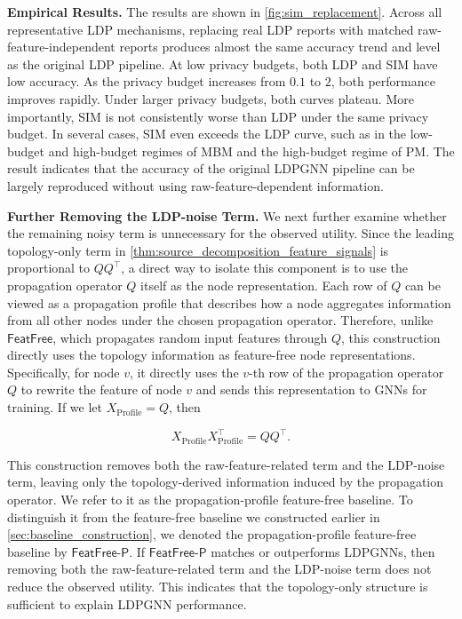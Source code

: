 \documentclass[conference,compsoc]{IEEEtran}
\theoremstyle{boldplain}
\theoremstyle{bolddefinition}
\theoremstyle{remark}
\newcommand{\mypara}[1]{\noindent\textbf{#1.}\xspace}
\newcommand{\ff}{\ensuremath{\mathsf{FeatFree}}\xspace}
\newcommand{\ldpgnn}{LDPGNN\xspace}
\newcommand{\ldpgnns}{LDPGNNs\xspace}
\newcommand{\mbmm}{MBM\xspace}
\newcommand{\pmm}{PM\xspace}
\newcommand{\ffprofile}{\ensuremath{\mathsf{FeatFree\text{-}P}}\xspace}
\begin{document}
\vspace{0.1cm}

\mypara{Empirical Results}
The results are shown in \autoref{fig:sim_replacement}. 
Across all representative LDP mechanisms, replacing real LDP reports with matched raw-feature-independent reports produces almost the same accuracy trend and level as the original LDP pipeline. 
At low privacy budgets, both LDP and SIM have low accuracy. 
As the privacy budget increases from $0.1$ to $2$, both performance improves rapidly. 
Under larger privacy budgets, both curves plateau. 
More importantly, SIM is not consistently worse than LDP under the same privacy budget.
In several cases, SIM even exceeds the LDP curve, such as in the low-budget and high-budget regimes of \mbmm and the high-budget regime of \pmm. 
The result indicates that the accuracy of the original \ldpgnn pipeline can be largely reproduced without using raw-feature-dependent information.

\vspace{0.1cm}

\mypara{Further Removing the LDP-noise Term}
We next further examine whether the remaining noisy term is unnecessary for the observed utility.
Since the leading topology-only term in \autoref{thm:source_decomposition_feature_signals} is proportional to $QQ^\top$, a direct way to isolate this component is to use the propagation operator $Q$ itself as the node representation. 
Each row of $Q$ can be viewed as a propagation profile that describes how a node aggregates information from all other nodes under the chosen propagation operator.
Therefore, unlike \ff, which propagates random input features through $Q$, this construction directly uses the topology information as feature-free node representations.
Specifically, for node $v$, it directly uses the $v$-th row of the propagation operator $Q$ to rewrite the feature of node $v$ and sends this representation to GNNs for training.
If we let $X_{\mathrm{Profile}} = Q$, then

\begin{equation}
    X_{\mathrm{Profile}}X_{\mathrm{Profile}}^\top = QQ^\top . 
\end{equation}

This construction removes both the raw-feature-related term and the LDP-noise term, leaving only the topology-derived information induced by the propagation operator. 
We refer to it as the propagation-profile feature-free baseline.
To distinguish it from the feature-free baseline we constructed earlier in \autoref{sec:baseline_construction}, we denoted the propagation-profile feature-free baseline by \ffprofile.
If \ffprofile matches or outperforms \ldpgnns, then removing both the raw-feature-related term and the LDP-noise term does not reduce the observed utility.
This indicates that the topology-only structure is sufficient to explain \ldpgnn performance.
\end{document}
